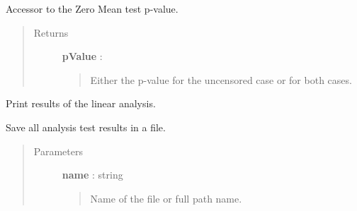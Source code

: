 \documentclass[letterpaper,10pt,english]{sphinxmanual}
\begin{document}
\begin{fulllineitems}
\begin{fulllineitems}
\end{fulllineitems}


\begin{fulllineitems}
\label{_generated/otpod.UnivariateLinearModelAnalysis:otpod.UnivariateLinearModelAnalysis.getZeroMeanPValue}
Accessor to the Zero Mean test p-value.
\begin{quote}\begin{description}
\item[{Returns}] \leavevmode
\textbf{pValue} : \href{http://doc.openturns.org/openturns-latest/sphinx/user\_manual/\_generated/openturns.NumericalPoint.html\#openturns.NumericalPoint}{}
\begin{quote}

Either the p-value for the uncensored case or for both cases.
\end{quote}

\end{description}\end{quote}

\end{fulllineitems}


\begin{fulllineitems}
\label{_generated/otpod.UnivariateLinearModelAnalysis:otpod.UnivariateLinearModelAnalysis.printResults}
Print results of the linear analysis.

\end{fulllineitems}


\begin{fulllineitems}
\label{_generated/otpod.UnivariateLinearModelAnalysis:otpod.UnivariateLinearModelAnalysis.saveResults}
Save all analysis test results in a file.
\begin{quote}\begin{description}
\item[{Parameters}] \leavevmode
\textbf{name} : string
\begin{quote}

Name of the file or full path name.
\end{quote}


\end{description}
\end{quote}
\end{fulllineitems}
\end{fulllineitems}
\end{document}
